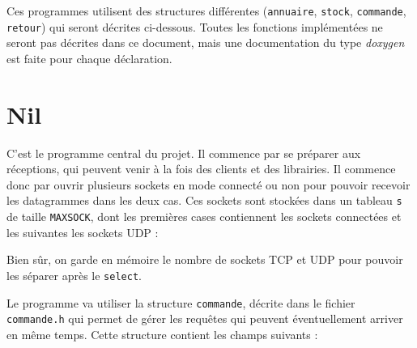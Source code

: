 \documentclass[10pt,a4paper]{article}
\begin{document}
\begin{multicols}{2}
Ces programmes utilisent des structures différentes (\texttt{annuaire}, \texttt{stock}, \texttt{commande}, \texttt{retour}) qui seront décrites ci-dessous. Toutes les fonctions implémentées ne seront pas décrites dans ce document, mais une documentation du type \emph{doxygen} est faite pour chaque déclaration.



\section{Nil}

C'est le programme central du projet. Il commence par se préparer aux réceptions, qui peuvent venir à la fois des clients et des librairies. Il commence donc par ouvrir plusieurs sockets en mode connecté ou non pour pouvoir recevoir les datagrammes dans les deux cas. Ces sockets sont stockées dans un tableau \texttt{s} de taille \texttt{MAXSOCK}, dont les premières cases contiennent les sockets connectées et les suivantes les sockets UDP :

\begin{center}
\end{center}

Bien sûr, on garde en mémoire le nombre de sockets TCP et UDP pour pouvoir les séparer après le \texttt{select}.

Le programme va utiliser la structure \texttt{commande}, décrite dans le fichier \texttt{commande.h} qui permet de gérer les requêtes qui peuvent éventuellement arriver en même temps. Cette structure contient les champs suivants :


\end{multicols}
\end{document}
